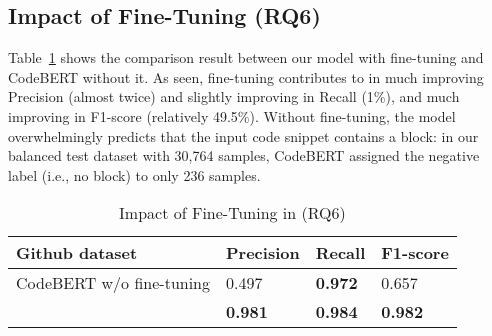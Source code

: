 \subsection{Impact of Fine-Tuning (RQ6)}
\label{sec:rq6}

Table~\ref{tab:codebert} shows the comparison result between
our model with fine-tuning and CodeBERT without it.
%
As seen, fine-tuning contributes to {\tool} in much improving
Precision (almost twice) and slightly improving in Recall (1\%), and
much improving in F1-score (relatively 49.5\%). Without fine-tuning,
the model
overwhelmingly predicts that the input code snippet contains a
 block: in our balanced test dataset with
30,764 samples, CodeBERT assigned the negative label (i.e., no
 block) to only 236 samples.




\begin{table}[htpb]
  \caption{Impact of Fine-Tuning in {\tool} (RQ6)}
  \vspace{-12pt}
  \small
	\begin{center}
		\renewcommand{\arraystretch}{1}
		\begin{tabular}{| p{3.15cm}<{\centering} | p{1.2cm}<{\centering} | p{1.2cm}<{\centering}| p{1.2cm}<{\centering}|}
		  \hline
			Github dataset  & Precision  &  Recall & F1-score \\
			\hline
			CodeBERT w/o fine-tuning & 0.497  & \textbf{0.972}   & 0.657\\
			\hline
			\tool   &  \textbf{0.981} &  {\bf 0.984} & \textbf{0.982}\\
			\hline
		\end{tabular}
		\label{tab:codebert}
	\end{center}
\end{table}

